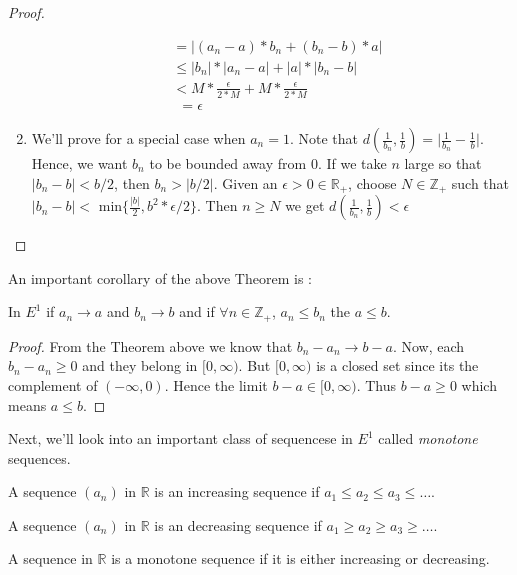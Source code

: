 \begin{proof}
\begin{enumerate}
\begin{displaymath}
\begin{aligned}
		    & =  \lvert (a_n - a)*b_n + (b_n - b)*a \rvert \\
		    & \leq \lvert b_n \rvert * \lvert a_n - a \rvert + \lvert a \rvert * \lvert b_n
		    - b \rvert \\
		    & < M*\frac{\epsilon}{2*M} +   M*\frac{\epsilon}{2*M} \\
		    & \ \ = \epsilon
		\end{aligned}
	    \end{displaymath}	
	\item We'll prove for a special case when $a_n = 1$. Note that $d(\frac{1}{b_n},\frac{1}{b})
	    = \lvert \frac{1}{b_n} - \frac{1}{b} \rvert$. Hence, we want $b_n$ to be bounded away 
	    from $0$. If we take $n$ large so that $\lvert b_n - b \rvert < b/2$, then $b_n > \lvert
	    b/2 \rvert$. Given an $\epsilon > 0 \in \mathbb{R}_+$, choose $N \in \mathbb{Z}_+$ such
	    that $\lvert b_n - b \rvert < \text{ min}\left.\lbrace \frac{\lvert b \rvert}{2},
		b^2*\epsilon/2 \rbrace\right.$. Then $n \geq N$ we get $d(\frac{1}{b_n},\frac{1}{b})
	    < \epsilon$
    \end{enumerate}
\end{proof}
An important corollary of the above Theorem is :
\begin{Corollary}
    In $E^1$ if $a_n \rightarrow a$ and $b_n \rightarrow b$ and if $\forall n \in \mathbb{Z}_+$,
$a_n \leq b_n$ the $a \leq b$. 
\end{Corollary}
\begin{proof}
    From the Theorem above we know that $b_n - a_n \rightarrow b - a$. Now, each $b_n - a_n \geq 0$
and they belong in $[0,\infty)$. But $[0,\infty)$ is a closed set since its the complement of
$(-\infty,0)$. Hence the limit $b-a \in [0,\infty)$. Thus $b-a \geq 0$ which means $a \leq b$.
\end{proof}
Next, we'll look into an important class of sequencese in $E^1$ called \emph{monotone} sequences.
\begin{Definition}
    A sequence $\left(a_n\right)$ in $\mathbb{R}$ is an increasing sequence if $a_1 \leq a_2 \leq
    a_3 \leq \dots$.
\end{Definition}
\begin{Definition}
    A sequence $\left(a_n\right)$ in $\mathbb{R}$ is an decreasing sequence if $a_1 \geq a_2 \geq
    a_3 \geq \dots$.
\end{Definition}
\begin{Definition}
    A sequence  in $\mathbb{R}$ is a monotone sequence if it is either increasing or decreasing.
\end{Definition}
